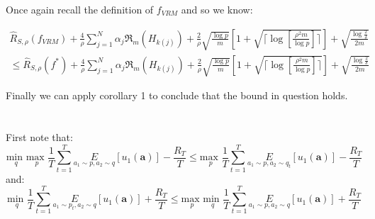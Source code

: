 \documentclass[]{article}
\begin{document}
\noindent Once again recall the definition of $f_{VRM}$ and so we know:

\begin{equation}
\begin{split}
\hat{R}_{S,\rho}\left(f_{VRM}\right) + \frac{4}{\rho} \sum_{j=1}^{N} \alpha_j \mathfrak{R}_m \left( H_{k \left( j \right)} \right) + \frac{2}{\rho} \sqrt{\frac{\log p}{m}} \left[1+\sqrt{\lceil \log \left[ \frac{\rho^2 m}{\log p} \right]\rceil}\right] + \sqrt{\frac{\log \frac{2}{\delta}}{2m}} \\
\le \hat{R}_{S,\rho}\left(f^*\right) + \frac{4}{\rho} \sum_{j=1}^{N} \alpha_j \mathfrak{R}_m \left( H_{k \left( j \right)} \right) + \frac{2}{\rho} \sqrt{\frac{\log p}{m}} \left[1+\sqrt{\lceil \log \left[ \frac{\rho^2 m}{\log p} \right]\rceil}\right] + \sqrt{\frac{\log \frac{2}{\delta}}{2m}}
\end{split}
\end{equation}

\noindent Finally we can apply corollary 1 to conclude that the bound in question holds.	

\section{}
\subsection{}

\subsection{}
First note that:
\begin{equation}
	\underset{q}{\text{min }}\underset{p}{\text{max }}\frac{1}{T}\sum_{t=1}^{T}\underset{a_1 \sim p, a_2 \sim q}{E}\left[u_1\left(\textbf{a}\right)\right] - \frac{R_T}{T}
	\le
	\underset{p}{\text{max }}\frac{1}{T}\sum_{t=1}^{T}\underset{a_1 \sim p, a_2 \sim q_t}{E}\left[u_1\left(\textbf{a}\right)\right] - \frac{R_T}{T}
\end{equation}
\noindent and:
\begin{equation}
	\underset{q}{\text{min }}\frac{1}{T}\sum_{t=1}^{T}\underset{a_1 \sim p_t, a_2 \sim q}{E}\left[u_1\left(\textbf{a}\right)\right] + \frac{R_T}{T}
	\le
	\underset{p}{\text{max }}\underset{q}{\text{min }}\frac{1}{T}\sum_{t=1}^{T}\underset{a_1 \sim p, a_2 \sim q}{E}\left[u_1\left(\textbf{a}\right)\right] + \frac{R_T}{T}
\end{equation}
\end{document}
